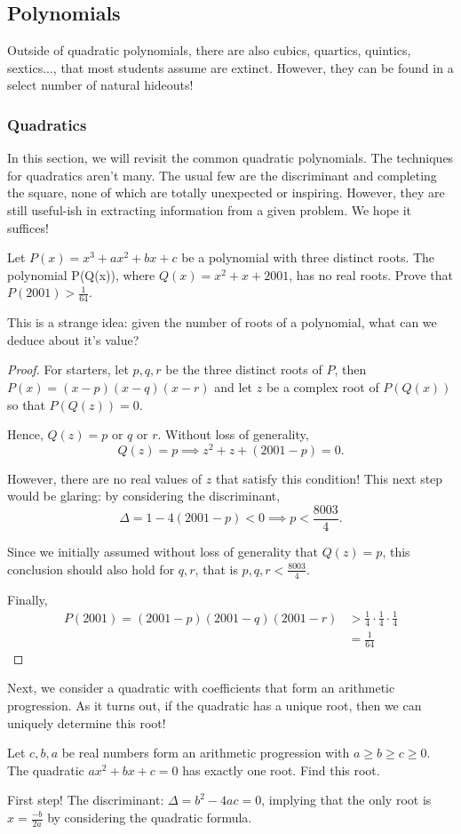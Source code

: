 \documentclass[../main.tex]{subfiles}
\begin{document}
\subsection{Polynomials}
Outside of quadratic polynomials, there are also cubics, quartics, quintics, sextics..., that most students assume are extinct. However, they can be found in a select number of natural hideouts!

\subsubsection{Quadratics}
In this section, we will revisit the common quadratic polynomials.
The techniques for quadratics aren't many. The usual few are the discriminant and completing the square, none of which are totally unexpected or inspiring. However, they are still useful-ish in extracting information from a given problem. We hope it suffices!
\begin{example}[2010-2011 Mandelbrot]
    Let $P(x)=x^3+ax^2+bx+c$ be a polynomial with three distinct roots. The polynomial P(Q(x)), where $Q(x)=x^2+x+2001$, has no real roots. Prove that $P(2001)>\frac{1}{64}$.
\end{example}
This is a strange idea: given the number of roots of a polynomial, what can we deduce about it's value?

\begin{proof}
    For starters, let $p,q,r$ be the three distinct roots of $P$, then $P(x)=(x-p)(x-q)(x-r)$ and let $z$ be a complex root of $P(Q(x))$ so that $P(Q(z))=0$. 

Hence, $Q(z)=\text{$p$ or $q$ or $r$}$. Without loss of generality, $$Q(z)=p \implies z^2+z+(2001-p)=0.$$

However, there are no real values of $z$ that satisfy this condition! This next step would be glaring: by considering the discriminant,
$$\Delta=1-4(2001-p) < 0 \implies p < \frac{8003}{4}.$$

Since we initially assumed without loss of generality that $Q(z)=p$, this conclusion should also hold for $q, r$, that is $p,q,r < \frac{8003}{4}$.

Finally, \begin{align*}
    P(2001)=(2001-p)(2001-q)(2001-r) &> \frac{1}{4}\cdot\frac{1}{4}\cdot\frac{1}{4} \\
    &=\frac{1}{64}
\end{align*}
\end{proof}
Next, we consider a quadratic with coefficients that form an arithmetic progression. As it turns out, if the quadratic has a unique root, then we can uniquely determine this root!
\begin{example}[2013 AMC 10B P19]
    Let $c,b,a$ be real numbers form an arithmetic progression with $a\geq b\geq c\geq 0$. The quadratic $ax^2+bx+c=0$ has exactly one root. Find this root.
\end{example}
First step! The discriminant: $\Delta=b^2-4ac=0$, implying that the only root is $x=\frac{-b}{2a}$ by considering the quadratic formula.
\end{document}
